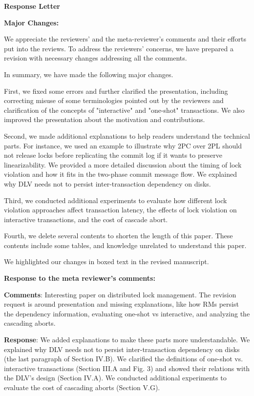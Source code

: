 \documentclass[conference]{IEEEtran}
\begin{document}
\iffalse
\begin{frame}{\relax}%

  \textbf{Response Letter}  


 \textbf{Major Changes:} 

  We appreciate the reviewers' and the meta-reviewer's comments and their efforts put into the reviews. To address the reviewers' concerns, we have prepared a revision with necessary changes addressing all the comments. 
  
  In summary, we have made the following major changes.
  
  First, we fixed some errors and further clarified the presentation, including correcting misuse of some terminologies pointed out by the reviewers and clarification of the concepts of "interactive" and "one-shot" transactions. We also improved the presentation about the motivation and contributions.
  
  Second, we made additional explanations to help readers understand the technical parts. For instance, we used an example to illustrate why 2PC over 2PL should not release locks before replicating the commit log if it wants to preserve linearizability. We provided a more detailed discussion about the timing of lock violation and how it fits in the two-phase commit message flow. We explained why DLV needs not to persist inter-transaction dependency on disks.
  
  Third, we conducted additional experiments to evaluate how different lock violation approaches affect transaction latency, the effects of lock violation on interactive transactions, and the cost of cascade abort.
  
  Fourth, we delete several contents to shorten the length of this paper. These contents include some tables, and knowledge unrelated to understand this paper.
  
  \begin{highlighted}
    We highlighted our changes  in boxed text in the revised manuscript.
  \end{highlighted}

 \textbf{Response to the meta reviewer’s comments:}

  \textbf{Comments}: Interesting paper on distributed lock management. The revision request is around presentation and missing explanations, like how RMs persist the dependency information, evaluating one-shot vs interactive, and analyzing the cascading aborts.
  
  \textbf{Response}: We added explanations to make these parts more understandable. We explained why DLV needs not to persist inter-transaction dependency on disks (the last paragraph of Section IV.B). We clarified the definitions of one-shot vs. interactive transactions (Section III.A and Fig. 3) and showed their relations with the DLV's design (Section IV.A).  We conducted additional experiments to evaluate the cost of cascading aborts (Section V.G).
  


\end{frame}
\end{document}
